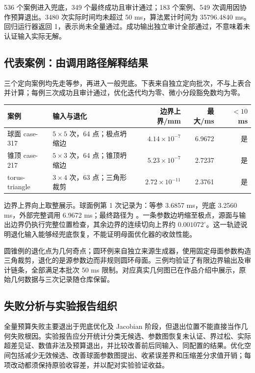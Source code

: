 \documentclass[UTF8,zihao=5,fontset=windows,a4paper]{ctexart}
\newcommand{\code}[1]{\texttt{\detokenize{#1}}}
\begin{document}
536 个案例进入兜底，349 个最终成功且审计通过；183 个案例、549 次调用因协作预算退出。3480 次实际时间均未超过 50 ms，算法累计时间为 35796.4840 ms。回归运行器返回 1，表示尚未全量通过。成功输出独立审计全部通过，不意味着未认证输入实际无解。

\subsection{代表案例：由调用路径解释结果}
三个定向案例均先走等参，再进入一般兜底。下表来自独立定向批次，不与上表合并计算；每例三次成功且审计通过，优化迭代均为零、微小分段豁免数均为零。
\begin{center}\small\renewcommand{\arraystretch}{1.2}
\begin{tabularx}{\linewidth}{@{}Yp{29mm}rrr@{}}\toprule
案例 & 输入与退化 & 边界上界/mm & 最大/ms & $<10$ ms\\\midrule
球面 case-317 & $5\times5$ 次，64 点；极点坍缩边 & $4.14\times10^{-7}$ & 6.9672 & 是\\
锥顶 case-217 & $5\times3$ 次，64 点；锥顶坍缩边 & $5.23\times10^{-7}$ & 2.7237 & 是\\
torus-triangle & $3\times4$ 次，63 点；三角形裁剪 & $2.72\times10^{-11}$ & 2.3761 & 是\\\bottomrule
\end{tabularx}
\end{center}
边界上界向上取整展示。球面例第 1 次记录为：等参 3.6857 ms，兜底 3.2560 ms，外部完整调用 6.9672 ms；最终路径为 \code{general_rational}。一条参数边坍缩至极点，源面与输出边界仍执行完整位置检查，其余边界的连续切向上界约 $0.001072^\circ$。这一轨迹说明退化输入能够经兜底恢复，不能证明母面优化器的收敛性能。

圆锥例的退化点为几何奇点；圆环例来自独立来源生成器，使用固定母面参数构造三角裁剪，退化的是源参数边而非规则圆环母面。三例均验证了有限边界输出及审计链条，全部满足本批次 50 ms 限制。对应真实几何图已在作品介绍中展示，原始几何数据与三次记录随仓库保留。

\subsection{失败分析与实验报告组织}
全量预算失败主要退出于兜底优化及 Jacobian 阶段，但退出位置不能直接当作几何失败根因。实验报告应分开统计分类无候选、参数图恢复未认证、界过松、实际超差见证、数值非法及预算退出，并比较改善前后同输入、同配置的结果。优化空间包括减少无效候选、改善球面参数图提出、收紧误差界和压缩差分求值开销；每项改动都须保持原验收容差，并以配对实验验证收益。
\end{document}
